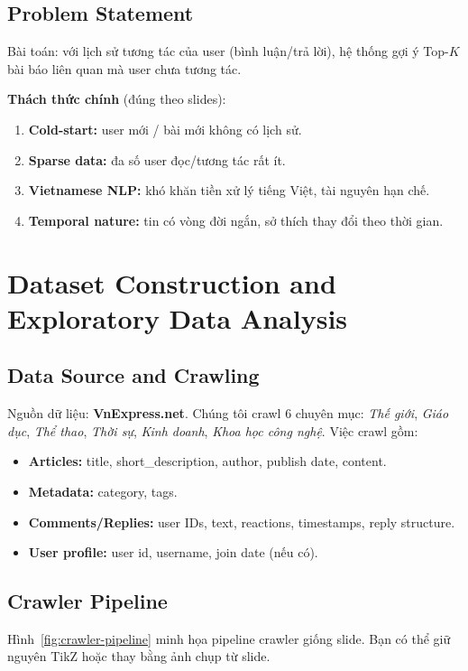 \documentclass[11pt]{article}
\newcommand{\figref}[1]{Hình~\ref{#1}}
\begin{document}
\subsection{Problem Statement}
Bài toán: với lịch sử tương tác của user (bình luận/trả lời), hệ thống gợi ý Top-$K$ bài báo liên quan mà user chưa tương tác.

\textbf{Thách thức chính} (đúng theo slides):
\begin{enumerate}
  \item \textbf{Cold-start:} user mới / bài mới không có lịch sử.
  \item \textbf{Sparse data:} đa số user đọc/tương tác rất ít.
  \item \textbf{Vietnamese NLP:} khó khăn tiền xử lý tiếng Việt, tài nguyên hạn chế.
  \item \textbf{Temporal nature:} tin có vòng đời ngắn, sở thích thay đổi theo thời gian.
\end{enumerate}

\section{Dataset Construction and Exploratory Data Analysis}
\label{sec:data}

\subsection{Data Source and Crawling}
Nguồn dữ liệu: \textbf{VnExpress.net}. Chúng tôi crawl 6 chuyên mục: \emph{Thế giới}, \emph{Giáo dục}, \emph{Thể thao}, \emph{Thời sự}, \emph{Kinh doanh}, \emph{Khoa học công nghệ}. Việc crawl gồm:
\begin{itemize}
  \item \textbf{Articles:} title, short\_description, author, publish date, content.
  \item \textbf{Metadata:} category, tags.
  \item \textbf{Comments/Replies:} user IDs, text, reactions, timestamps, reply structure.
  \item \textbf{User profile:} user id, username, join date (nếu có).
\end{itemize}

\subsection{Crawler Pipeline}
\figref{fig:crawler-pipeline} minh họa pipeline crawler giống slide. Bạn có thể giữ nguyên TikZ hoặc thay bằng ảnh chụp từ slide.
\end{document}
